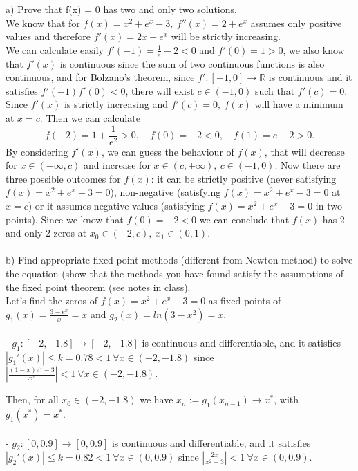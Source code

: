 \documentclass[12pt,letterpaper]{article}
\theoremstyle{definition}
\begin{document}
\quad a) Prove that f(x) = 0 has two and only two solutions.
\\
We know that for $f(x) = x^2 + e^x -3, \ f''(x) = 2+e^x$  assumes only positive values and therefore $f'(x) = 2x+e^x $ will be strictly increasing. 
\\
We can calculate easily $f'(-1) = \frac{1}{e} -2 < 0$ and $f'(0) = 1 > 0$, we also know that $f'(x)$ is continuous since the sum of two continuous functions is also continuous, and for Bolzano's theorem, since $f' : [-1, 0] \rightarrow \mathbb{R}$ is continuous and it satisfies $f'(-1)f'(0) < 0$, there will exist $c \in (-1, 0)$ such that $f'(c) = 0$.
\\
Since $f'(x)$ is strictly increasing and $f'(c) = 0, \ f(x)$ will have a minimum at $x = c.$ Then we can calculate 
$$
f(-2) = 1 + \frac{1}{e^2}  > 0, \quad
f(0) = -2 < 0, \quad
f(1) = e - 2 > 0.$$
By considering $f'(x)$, we can guess the behaviour of $f(x)$, that will decrease for $x \in (- \infty, c)$ and increase for $x \in (c, + \infty), \ c \in (-1, 0).$ Now there are three possible outcomes for $f(x)$: it can be strictly positive (never satisfying $f(x) = x^2 + e^x -3 =0$), non-negative (satisfying  $f(x) = x^2 + e^x -3 =0$ at $x=c$) or it assumes negative values  (satisfying  $f(x) = x^2 + e^x -3 =0$ in two points). Since we know that $f(0) = -2 < 0$ we can conclude that $f(x)$ has 2 and only 2 zeros at $x_0 \in (-2, c), \ x_1 \in (0, 1).$
\\ \\
\quad b) Find  appropriate fixed point methods (different from Newton method) to solve the equation
(show that the methods you have found satisfy the assumptions of the fixed point theorem (see
notes in class).
\\
Let's find the zeros of $f(x) = x^2+ e^x -3 = 0$ as fixed points of 
\\ $g_1(x) = \frac{3-e^x}{x} = x$ and $g_2(x)= ln (3-x^2)= x$.
\\ \\
- $g_1 : [-2, -1.8] \rightarrow [-2, -1.8] $ is continuous and differentiable, and it satisfies $|g_1'(x)| \leq k = 0.78 < 1 \ \forall x \in (-2, -1.8)$ since $|\frac{(1-x)e^x-3}{x^2}|< 1 \ \forall x \in (-2, -1.8)$. 

Then, for all $x_0 \in (-2, -1.8)$ we have $x_n := g_1(x_{n-1}) \rightarrow x^*$, with $g_1(x^*)=x^*.$
\\ \\
- $g_2 : [0, 0.9] \rightarrow [0, 0.9] $ is continuous and differentiable, and it satisfies \\ $|g_2'(x)| \leq k = 0.82 < 1 \ \forall x \in (0, 0.9)$ since $|\frac{2x}{x^2-3}|< 1 \ \forall x \in (0, 0.9)$. 
\end{document}
